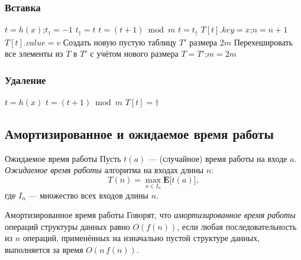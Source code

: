 \subsubsection*{Вставка}
\begin{algorithmic}[1]
	\State $t = h(x)$;\quad $t_{\dagger} = -1$
	\State $t_{\dagger} = t$
	\EndIf
	\State $t = (t + 1) \bmod m$
	\EndWhile
	\State $t = t_{\dagger}$
	\EndIf
	\State $T[t].\mathit{key} = x$;\quad $n = n + 1$
	\EndIf
	\State $T[t].\mathit{value} = v$
	\State Создать новую пустую таблицу $T'$ размера $2m$
	\State Перехешировать все элементы из $T$ в $T'$ с учётом нового размера
	\State $T = T'$;\quad $m = 2m$
	\EndIf
	\EndFunction
\end{algorithmic}

\subsubsection*{Удаление}

\begin{algorithmic}[1]
	\State $t = h(x)$
	\State $t = (t + 1) \bmod m$
	\EndWhile
	\State $T[t] = \dagger$ 
	\EndIf
	\EndFunction
\end{algorithmic}

\subsection{Амортизированное и ожидаемое время работы}

\begin{Definition}{Ожидаемое время работы}{}
	Пусть $t(a)$ --- (случайное) время работы на входе $a$. \emph{Ожидаемое время работы} алгоритма на входах длины $n$:
	\[
	T(n) = \max_{a \in I_n} \mathbf{E}\bigl[t(a)\bigr],
	\]
	где $I_n$ --- множество всех входов длины $n$.
\end{Definition}

\begin{Definition}{Амортизированное время работы}{}
	Говорят, что \emph{амортизированное время работы} операций структуры данных равно $O(f(n))$, если любая последовательность из $n$ операций, применённых на изначально пустой структуре данных, выполняется за время $O(n\, f(n))$.
\end{Definition}

